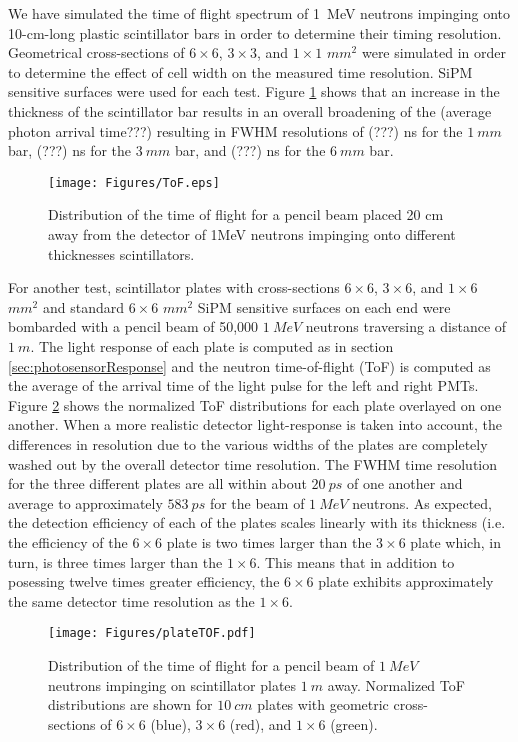 We have simulated the time of flight spectrum of 1~MeV neutrons impinging onto 10-cm-long plastic scintillator bars in order to determine their timing resolution. Geometrical cross-sections of $6 \times 6$, $3 \times 3$, and $1 \times 1$ $mm^{2}$ were simulated in order to determine the effect of cell width on the measured time resolution. SiPM sensitive surfaces were used for each test. Figure \ref{fig:ToF} shows that an increase in the thickness of the scintillator bar results in an overall broadening of the (average photon arrival time???) resulting in FWHM resolutions of (???) ns for the $1~mm$ bar, (???) ns for the $3~mm$ bar, and (???) ns for the $6~mm$ bar.

\begin{figure}[htb]
\centering
\texttt{[image: Figures/ToF.eps]}
\caption{Distribution of the time of flight for a pencil beam  placed 20 cm away from the detector of 1MeV  neutrons impinging onto different thicknesses scintillators.}
\label{fig:ToF}
\end{figure}

For another test, scintillator plates with cross-sections $6 \times 6$, $3 \times 6$, and $1 \times 6$ $mm^{2}$ and standard $6 \times 6$ $mm^{2}$ SiPM sensitive surfaces on each end were bombarded with a pencil beam of 50,000 $1~MeV$ neutrons traversing a distance of $1~m$. The light response of each plate is computed as in section \ref{sec:photosensorResponse} and the neutron time-of-flight (ToF) is computed as the average of the arrival time of the light pulse for the left and right PMTs. Figure \ref{fig:plateTOF} shows the normalized ToF distributions for each plate overlayed on one another. When a more realistic detector light-response is taken into account, the differences in resolution due to the various widths of the plates are completely washed out by the overall detector time resolution. The FWHM time resolution for the three different plates are all within about $20~ps$ of one another and average to approximately $583~ps$ for the beam of $1~MeV$ neutrons. As expected, the detection efficiency of each of the plates scales linearly with its thickness (i.e. the efficiency of the $6 \times 6$ plate is two times larger than the $3 \times 6$ plate which, in turn, is three times larger than the $1 \times 6$. This means that in addition to posessing twelve times greater efficiency, the $6 \times 6$ plate exhibits approximately the same detector time resolution as the $1 \times 6$.

\begin{figure}[htb]
\centering
\texttt{[image: Figures/plateTOF.pdf]}
\caption{Distribution of the time of flight for a pencil beam of $1~MeV$ neutrons impinging on scintillator plates $1~m$ away. Normalized ToF distributions are shown for $10~cm$ plates with geometric cross-sections of $6 \times 6$ (blue), $3 \times 6$ (red), and $1 \times 6$ (green).}
\label{fig:plateTOF}
\end{figure}

